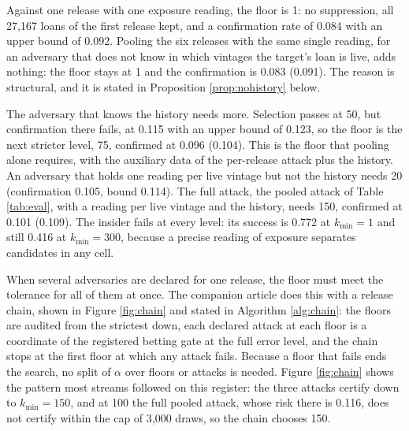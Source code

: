\documentclass[11pt,a4paper]{article}
\theoremstyle{plain}
\theoremstyle{definition}
\theoremstyle{definition}
\theoremstyle{plain}
\begin{document}




Against one release with one exposure reading, the floor is 1: no suppression, all
27{,}167 loans of the first release kept, and a confirmation rate of 0.084 with an
upper bound of 0.092. Pooling the six releases with the same single reading, for
an adversary that does not know in which vintages the target's loan is live, adds
nothing: the floor stays at 1 and the confirmation is 0.083 (0.091). The reason is
structural, and it is stated in Proposition \ref{prop:nohistory} below.

The adversary that knows the history needs more. Selection passes at 50, but
confirmation there fails, at 0.115 with an upper bound of 0.123, so the floor is
the next stricter level, 75, confirmed at 0.096 (0.104). This is the floor that
pooling alone requires, with the auxiliary data of the per-release attack plus
the history. An adversary that holds one reading per live vintage but not the
history needs 20 (confirmation 0.105, bound 0.114). The full attack, the pooled
attack of Table \ref{tab:eval}, with a reading per live vintage and the history,
needs 150, confirmed at 0.101 (0.109). The insider fails at every level: its
success is 0.772 at $k_{\min} = 1$ and still 0.416 at $k_{\min} = 300$, because a
precise reading of exposure separates candidates in any cell.

When several adversaries are declared for one release, the floor must meet the
tolerance for all of them at once. The companion article does this with a release
chain, shown in Figure \ref{fig:chain} and stated in Algorithm \ref{alg:chain}:
the floors are audited from the strictest down, each declared attack at each
floor is a coordinate of the registered betting gate at the full error level, and
the chain stops at the first floor at which any attack fails. Because a floor
that fails ends the search, no split of $\alpha$ over floors or attacks is needed.
Figure \ref{fig:chain} shows the pattern most streams followed on this register:
the three attacks certify down to $k_{\min} = 150$, and at 100 the full pooled
attack, whose risk there is 0.116, does not certify within the cap of 3{,}000
draws, so the chain chooses 150.



\end{document}
